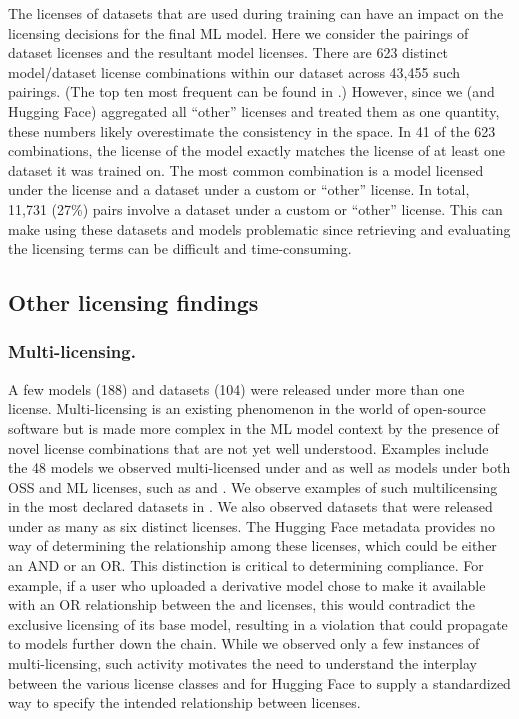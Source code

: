 The licenses of datasets that are used during training can have an impact on the licensing decisions for the final ML model.  Here we consider the pairings of dataset licenses and the resultant model licenses.  There are 623 distinct model/dataset license combinations within our dataset across 43,455 such pairings. %
(The top ten most frequent can be found in .)  However, since we (and Hugging Face) aggregated all ``other'' licenses and treated them as one quantity, these numbers likely overestimate the consistency in the space. In 41 of the 623 combinations, the license of the model exactly matches the license of at least one dataset it was trained on. %
The most common combination is a model licensed under the  license and a dataset under a custom or ``other'' license.  In total, 11,731 (27\%) pairs involve a dataset under a custom or ``other'' license. This can make using these datasets and models problematic since retrieving and evaluating the licensing terms can be difficult and time-consuming. %

\subsection{Other licensing findings}


\subsubsection{Multi-licensing.}
\label{sec:multilicensing}
A few models (188) %
and datasets (104) were released under more than one license. Multi-licensing is an existing phenomenon in the world of open-source software but is made more complex in the ML model context by the presence of novel license combinations that are not yet well understood.  Examples include the 48 models we observed multi-licensed under  and  as well as models under both OSS and ML licenses, such as  and . We observe examples of such multilicensing in the most declared datasets in . %
We also observed datasets that were released under as many as six distinct licenses. %
The Hugging Face metadata provides no way of determining the relationship among these licenses, which could be either an AND or an OR. This distinction is critical to determining compliance.  For example, if a user who uploaded a  derivative model chose to make it available with an OR relationship between the  and  licenses, this would contradict the exclusive  licensing of its base model, resulting in a violation that could propagate to models further down the chain. %
While we observed only a few instances of multi-licensing, such activity motivates the need to understand the interplay between the various license classes and for Hugging Face to supply a standardized way to specify the intended relationship between licenses.

